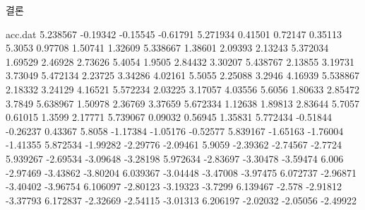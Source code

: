 \documentclass[Junlampaper, portrait]{Junlam_PosterK}
\begin{document}
\begin{poster}
\begin{posterbox}[name=result,column=3,]{결론  }
\begin{filecontents}{acc.dat}
                5.238567	-0.19342	-0.15545	-0.61791
                5.271934	0.41501	0.72147	0.35113
                5.3053	0.97708	1.50741	1.32609
                5.338667	1.38601	2.09393	2.13243
                5.372034	1.69529	2.46928	2.73626
                5.4054	1.9505	2.84432	3.30207
                5.438767	2.13855	3.19731	3.73049
                5.472134	2.23725	3.34286	4.02161
                5.5055	2.25088	3.2946	4.16939
                5.538867	2.18332	3.24129	4.16521
                5.572234	2.03225	3.17057	4.03556
                5.6056	1.80633	2.85472	3.7849
                5.638967	1.50978	2.36769	3.37659
                5.672334	1.12638	1.89813	2.83644
                5.7057	0.61015	1.3599	2.17771
                5.739067	0.09032	0.56945	1.35831
                5.772434	-0.51844	-0.26237	0.43367
                5.8058	-1.17384	-1.05176	-0.52577
                5.839167	-1.65163	-1.76004	-1.41355
                5.872534	-1.99282	-2.29776	-2.09461
                5.9059	-2.39362	-2.74567	-2.7724
                5.939267	-2.69534	-3.09648	-3.28198
                5.972634	-2.83697	-3.30478	-3.59474
                6.006	-2.97469	-3.43862	-3.80204
                6.039367	-3.04448	-3.47008	-3.97475
                6.072737	-2.96871	-3.40402	-3.96754
                6.106097	-2.80123	-3.19323	-3.7299
                6.139467	-2.578	-2.91812	-3.37793
                6.172837	-2.32669	-2.54115	-3.01313
                6.206197	-2.02032	-2.05056	-2.49922                    
            \end{filecontents}
        

\end{posterbox}
\end{poster}
\end{document}
